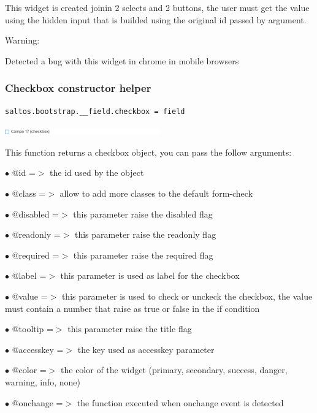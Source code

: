 \documentclass[a4paper]{article}
\begin{document}
This widget is created joinin 2 selects and 2 buttons, the user must get the value
using the hidden input that is builded using the original id passed by argument.

Warning:

Detected a bug with this widget in chrome in mobile browsers

\hypertarget{toc65}{}
\subsubsection{Checkbox constructor helper}

\begin{lstlisting}
saltos.bootstrap.__field.checkbox = field
\end{lstlisting}

\begin{center}\includegraphics[width=0.5\textwidth]{../ujest/snaps/test-bootstrap-js-bootstrap-campo-17-checkbox-1-snap.png}\end{center}

This function returns a checkbox object, you can pass the follow arguments:

\begin{compactitem}
\item[\color{myblue}$\bullet$] @id        =$>$ the id used by the object
\item[\color{myblue}$\bullet$] @class     =$>$ allow to add more classes to the default form-check
\item[\color{myblue}$\bullet$] @disabled  =$>$ this parameter raise the disabled flag
\item[\color{myblue}$\bullet$] @readonly  =$>$ this parameter raise the readonly flag
\item[\color{myblue}$\bullet$] @required  =$>$ this parameter raise the required flag
\item[\color{myblue}$\bullet$] @label     =$>$ this parameter is used as label for the checkbox
\item[\color{myblue}$\bullet$] @value     =$>$ this parameter is used to check or unckeck the checkbox, the value
              must contain a number that raise as true or false in the if condition
\item[\color{myblue}$\bullet$] @tooltip   =$>$ this parameter raise the title flag
\item[\color{myblue}$\bullet$] @accesskey =$>$ the key used as accesskey parameter
\item[\color{myblue}$\bullet$] @color     =$>$ the color of the widget (primary, secondary, success, danger, warning, info, none)
\item[\color{myblue}$\bullet$] @onchange  =$>$ the function executed when onchange event is detected
\end{compactitem}
\end{document}
